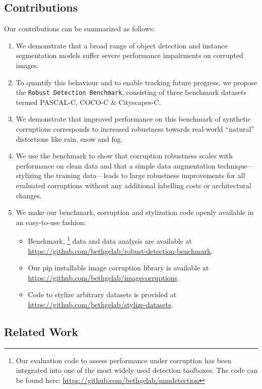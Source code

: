 \documentclass{article}
\begin{document}
\subsection{Contributions}
Our contributions can be summarized as follows:
\begin{enumerate}
    \item We demonstrate that a broad range of object detection and instance segmentation models suffer severe performance impairments on corrupted images.
    \item To quantify this behaviour and to enable tracking future progress, we propose the \texttt{Robust Detection Benchmark}, consisting of three benchmark datasets termed PASCAL-C, COCO-C \& Cityscapes-C.
    \item We demonstrate that improved performance on this benchmark of synthetic corruptions corresponds to increased robustness towards real-world ``natural'' distortions like rain, snow and fog.
    \item We use the benchmark to show that corruption robustness scales with performance on clean data and that a simple data augmentation technique---stylizing the training data---leads to large robustness improvements for all evaluated corruptions without any additional labelling costs or architectural changes.
   
    \item We make our benchmark, corruption and stylization code openly available in an easy-to-use fashion:
    
    \begin{itemize}
        \item Benchmark,
        \footnote{Our evaluation code to assess performance under corruption has been integrated into one of the most widely used detection toolboxes. The code can be found here: \url{https://github.com/bethgelab/mmdetection}}
        data and data analysis are available at \url{https://github.com/bethgelab/robust-detection-benchmark}.
        \item Our pip installable image corruption library is available at \url{https://github.com/bethgelab/imagecorruptions}.
        \item Code to stylize arbitrary datasets is provided at \url{https://github.com/bethgelab/stylize-datasets}.
    \end{itemize}
   
\end{enumerate}


\subsection{Related Work}
\end{document}
